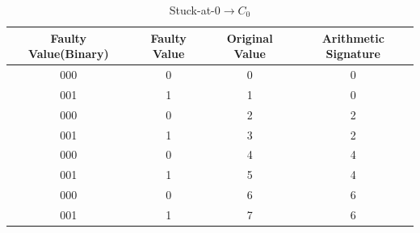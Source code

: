 \begin{table}[tb!]
\center
\caption{Stuck-at-0$\rightarrow C_0$}
\label{c@0-c0}
\begin{tabular}{|c | c| c | c| } 
 \hline
 \rowcolor{lightgray}
Faulty Value(Binary) & Faulty Value & Original Value & Arithmetic Signature   \\ 
\hline
 
 
 000& 0 &0 & 0  \\
 \hline
 001 & 1 & 1 & 0 \\ 
 \hline
 
 000 & 0 & 2 & 2 \\
 \hline
 001& 1& 3& 2 \\
 \hline
 000 & 0  &  4& 4 \\
 \hline
 001 & 1 & 5 &4  \\
 \hline
 000 & 0 & 6 & 6 \\
 \hline
 001 & 1 & 7 & 6 \\
 \hline
 
 
\end{tabular}
\end{table}
